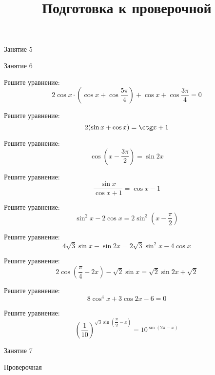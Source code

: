 \begin{class}[number=5]
	\begin{listofex}
		\item Занятие 5
	\end{listofex}
\end{class}

\begin{class}[number=6]
	\begin{listofex}
		\item Занятие 6
	\end{listofex}
\end{class}

\begin{homework}[number=3]
	\begin{listofex}
		\item Решите уравнение:
		\[2\cos x\cdot\left( \cos x+\cos\dfrac{5\pi}{4} \right)+\cos x+\cos\dfrac{3\pi}{4}=0\]
		\item Решите уравнение:
		\[2(\sin x+\cos x)=\ctg x+1\]
		\item Решите уравнение:
		\[\cos\left( x-\dfrac{3\pi}{2} \right)=\sin2x\]
		\item Решите уравнение:
		\[\dfrac{\sin x}{\cos x+1}=\cos x-1\]
		\item Решите уравнение:
		\[\sin^2x-2\cos x=2\sin^3\left( x-\dfrac{\pi}{2} \right)\]
		\item Решите уравнение:
		\[4\sqrt{3}\sin x-\sin2x=2\sqrt{3}\sin^2x-4\cos x\]
		\item Решите уравнение:
		\[2\cos\left( \dfrac{\pi}{4}-2x \right)-\sqrt{2}\sin x=\sqrt{2}\sin2x+\sqrt{2}\]
		\item Решите уравнение:
		\[8\cos^4x+3\cos2x-6=0\]
		\item Решите уравнение:
		\[\left( \frac{1}{10} \right)^{\sqrt{3}\sin\left( \dfrac{\pi}{2}-x \right)}=10^{\sin(2\pi-x)}\]
	\end{listofex}
\end{homework}

\begin{class}[number=7]
	\title{Подготовка к проверочной}
	\begin{listofex}
		\item Занятие 7
	\end{listofex}
\end{class}

\begin{exam}
	\begin{listofex}
		\item Проверочная
	\end{listofex}
\end{exam}
